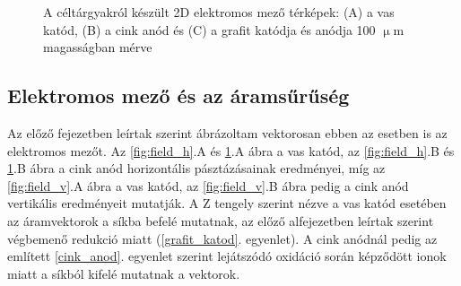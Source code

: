 \begin{figure}
\caption{A céltárgyakról készült 2D elektromos mező térképek:
(A) a vas katód, (B) a cink anód és (C) a grafit katódja és anódja 100 $\upmu$m magasságban mérve}
\label{fig:field_h1}
\end{figure}

\subsection{Elektromos mező és az áramsűrűség}

Az előző fejezetben leírtak szerint ábrázoltam vektorosan ebben az esetben is az elektromos mezőt. Az \ref{fig:field_h}.A és \ref{fig:field_h1}.A ábra a vas katód, az \ref{fig:field_h}.B és \ref{fig:field_h1}.B ábra a cink anód horizontális pásztázásainak eredményei, míg az \ref{fig:field_v}.A ábra a vas katód, az \ref{fig:field_v}.B ábra pedig a cink anód vertikális eredményeit mutatják. A Z tengely szerint nézve a vas katód esetében az áramvektorok a síkba befelé mutatnak, az előző alfejezetben leírtak szerint végbemenő redukció miatt (\ref{grafit_katod}. egyenlet). A cink anódnál pedig az említett \ref{cink_anod}. egyenlet szerint lejátszódó oxidáció során képződött ionok miatt a síkból kifelé mutatnak a vektorok.

